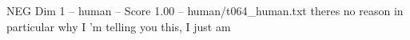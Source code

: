 \begin{textsample}{NEG Dim 1 – human – Score 1.00 – human/t064\_human.txt}  \label{ex:f1_neg_008}
theres no reason in particular why I ’m telling you this, I just am

\end{textsample}
